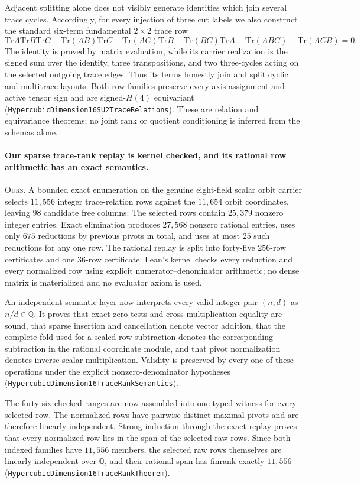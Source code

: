 \documentclass[11pt]{article}
\theoremstyle{definition}
\newcommand{\Tr}{\mathrm{Tr}}
\begin{document}
Adjacent splitting alone does not visibly generate identities which join
several trace cycles.  Accordingly, for every injection of three cut labels
we also construct the standard six-term fundamental $2\times2$ trace row
\[
 \Tr A\Tr B\Tr C-\Tr(AB)\Tr C-\Tr(AC)\Tr B-\Tr(BC)\Tr A
 +\Tr(ABC)+\Tr(ACB)=0.
\]
The identity is proved by matrix evaluation, while its carrier realization is
the signed sum over the identity, three transpositions, and two three-cycles
acting on the selected outgoing trace edges.  Thus its terms honestly join
and split cyclic and multitrace layouts.  Both row families preserve every
axis assignment and active tensor sign and are signed-$H(4)$ equivariant
(\texttt{HypercubicDimension16SU2TraceRelations}).  These are relation and
equivariance theorems; no joint rank or quotient conditioning is inferred
from the schemas alone.

\paragraph{Our sparse trace-rank replay is kernel checked, and its rational
row arithmetic has an exact semantics.}
\textsc{Ours.} A bounded exact enumeration on the genuine eight-field scalar
orbit carrier selects $11{,}556$ integer trace-relation rows against the
$11{,}654$ orbit coordinates, leaving $98$ candidate free columns.  The
selected rows contain $25{,}379$ nonzero integer entries.  Exact elimination
produces $27{,}568$ nonzero rational entries, uses only $675$ reductions by
previous pivots in total, and uses at most $25$ such reductions for any one
row.  The rational replay is split into forty-five $256$-row certificates and
one $36$-row certificate.  Lean's kernel checks every reduction and every
normalized row using explicit numerator--denominator arithmetic; no dense
matrix is materialized and no evaluator axiom is used.

An independent semantic layer now interprets every valid integer pair
$(n,d)$ as $n/d\in\mathbb Q$.  It proves that exact zero tests and
cross-multiplication equality are sound, that sparse insertion and
cancellation denote vector addition, that the complete fold used for a
scaled row subtraction denotes the corresponding subtraction in the
rational coordinate module, and that pivot normalization denotes inverse
scalar multiplication.  Validity is preserved by every one of these
operations under the explicit nonzero-denominator hypotheses
(\texttt{HypercubicDimension16TraceRankSemantics}).

The forty-six checked ranges are now assembled into one typed witness for
every selected row.  The normalized rows have pairwise distinct maximal
pivots and are therefore linearly independent.  Strong induction through the
exact replay proves that every normalized row lies in the span of the selected
raw rows.  Since both indexed families have $11{,}556$ members, the selected
raw rows themselves are linearly independent over $\mathbb Q$, and their
rational span has finrank exactly $11{,}556$
(\texttt{HypercubicDimension16TraceRankTheorem}).
\end{document}
